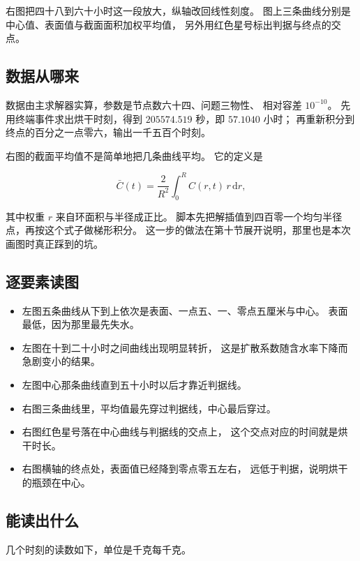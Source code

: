 \documentclass[11pt,a4paper]{article}
\begin{document}
右图把四十八到六十小时这一段放大，纵轴改回线性刻度。
图上三条曲线分别是中心值、表面值与截面面积加权平均值，
另外用红色星号标出判据与终点的交点。

\subsection{数据从哪来}

数据由主求解器实算，参数是节点数六十四、问题三物性、
相对容差 $10^{-10}$。
先用终端事件求出烘干时刻，得到 $205574.519$ 秒，即 $57.1040$ 小时；
再重新积分到终点的百分之一点零六，输出一千五百个时刻。

右图的截面平均值不是简单地把几条曲线平均。
它的定义是

\begin{equation}
\bar C(t)=\frac{2}{R^2}\int_0^{R}C(r,t)\,r\,\mathrm{d}r ,
\end{equation}

其中权重 $r$ 来自环面积与半径成正比。
脚本先把解插值到四百零一个均匀半径点，再按这个式子做梯形积分。
这一步的做法在第十节展开说明，那里也是本次画图时真正踩到的坑。

\subsection{逐要素读图}

\begin{itemize}[leftmargin=1.6em]
\item 左图五条曲线从下到上依次是表面、一点五、一、零点五厘米与中心。
      表面最低，因为那里最先失水。
\item 左图在十到二十小时之间曲线出现明显转折，
      这是扩散系数随含水率下降而急剧变小的结果。
\item 左图中心那条曲线直到五十小时以后才靠近判据线。
\item 右图三条曲线里，平均值最先穿过判据线，中心最后穿过。
\item 右图红色星号落在中心曲线与判据线的交点上，
      这个交点对应的时间就是烘干时长。
\item 右图横轴的终点处，表面值已经降到零点零五左右，
      远低于判据，说明烘干的瓶颈在中心。
\end{itemize}

\subsection{能读出什么}

几个时刻的读数如下，单位是千克每千克。
\end{document}
